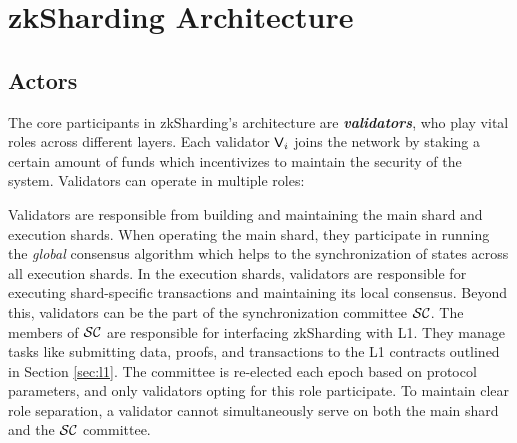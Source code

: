 \section{zkSharding Architecture}
\label{sec:architecture}


\subsection{Actors}

The core participants in zkSharding’s architecture are
\emph{\textbf{validators}}, who play vital roles across different layers.
Each validator $\mathsf{V}_i$ joins the network by staking a certain amount of
funds which incentivizes to maintain the security of the system.
Validators can
operate in multiple roles:

Validators are responsible from building and maintaining the main shard
and execution shards. When operating the main shard, they participate in
running the \emph{global} consensus algorithm which helps to the
synchronization of states across all execution shards.	In the execution
shards, validators are responsible for executing shard-specific
transactions and maintaining its local consensus. Beyond this, validators
can be the part of the synchronization committee ${\mathcal{SC}}$. The members
of ${\mathcal{SC}}$ are responsible for interfacing zkSharding with L1. They
manage tasks like submitting data, proofs, and transactions to the L1
contracts outlined in Section \ref{sec:l1}. The committee is re-elected
each epoch based on protocol parameters, and only validators opting for
this role participate. To maintain clear role separation, a validator
cannot simultaneously serve on both the main shard and the ${\mathcal{SC}}$
committee.

